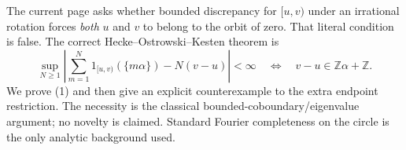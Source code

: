 The current page asks whether bounded discrepancy for $[u,v)$ under an irrational rotation forces \emph{both} $u$ and $v$ to belong to the orbit of zero. That literal condition is false. The correct Hecke--Ostrowski--Kesten theorem is
\[
 \sup_{N\ge1}\left|\sum_{m=1}^{N}1_{[u,v)}(\{m\alpha\})-N(v-u)\right|<\infty
 \quad\Longleftrightarrow\quad
 v-u\in\mathbb Z\alpha+\mathbb Z.
 \tag{1}
\]
We prove (1) and then give an explicit counterexample to the extra endpoint restriction. The necessity is the classical bounded-coboundary/eigenvalue argument; no novelty is claimed. Standard Fourier completeness on the circle is the only analytic background used.
